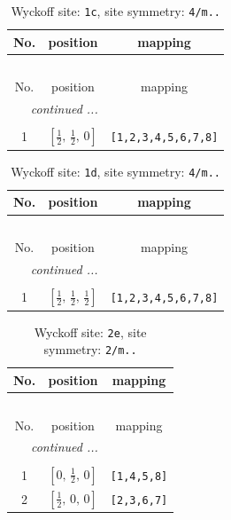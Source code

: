 \documentclass[fleqn,8pt]{jsarticle}
\begin{document}
\begin{longtable}{ccc}
\caption{Wyckoff site: {\tt 1c}, site symmetry: {\tt 4/m..}}
 \\
 \hline \hline
No. & position & mapping \\ \hline \endfirsthead

\multicolumn{2}{l}{\tablename\ \thetable{}} \\
 \hline \hline
No. & position & mapping \\ \hline \endhead

 \hline \hline
\multicolumn{2}{r}{\footnotesize\it continued ...} \\ \endfoot

 \hline \hline
\multicolumn{2}{r}{} \\ \endlastfoot

1 & $\left[ \frac{1}{2},\, \frac{1}{2},\, 0 \right]$ & {\tt [1,2,3,4,5,6,7,8]} \\
\end{longtable}
\renewcommand{\arraystretch}{1.2}
\begin{longtable}{ccc}
\caption{Wyckoff site: {\tt 1d}, site symmetry: {\tt 4/m..}}
 \\
 \hline \hline
No. & position & mapping \\ \hline \endfirsthead

\multicolumn{2}{l}{\tablename\ \thetable{}} \\
 \hline \hline
No. & position & mapping \\ \hline \endhead

 \hline \hline
\multicolumn{2}{r}{\footnotesize\it continued ...} \\ \endfoot

 \hline \hline
\multicolumn{2}{r}{} \\ \endlastfoot

1 & $\left[ \frac{1}{2},\, \frac{1}{2},\, \frac{1}{2} \right]$ & {\tt [1,2,3,4,5,6,7,8]} \\
\end{longtable}
\renewcommand{\arraystretch}{1.2}
\begin{longtable}{ccc}
\caption{Wyckoff site: {\tt 2e}, site symmetry: {\tt 2/m..}}
 \\
 \hline \hline
No. & position & mapping \\ \hline \endfirsthead

\multicolumn{2}{l}{\tablename\ \thetable{}} \\
 \hline \hline
No. & position & mapping \\ \hline \endhead

 \hline \hline
\multicolumn{2}{r}{\footnotesize\it continued ...} \\ \endfoot

 \hline \hline
\multicolumn{2}{r}{} \\ \endlastfoot

1 & $\left[ 0,\, \frac{1}{2},\, 0 \right]$ & {\tt [1,4,5,8]} \\ \hline
2 & $\left[ \frac{1}{2},\, 0,\, 0 \right]$ & {\tt [2,3,6,7]} \\
\end{longtable}
\end{document}
